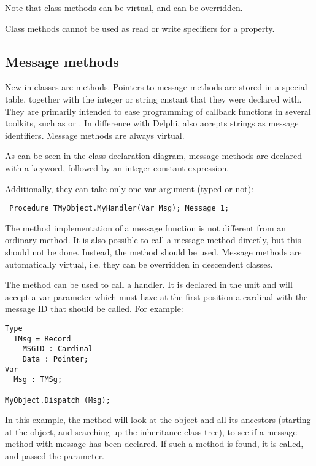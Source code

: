 Note that class methods can be virtual, and can be overridden.

Class methods cannot be used as read or write specifiers for a
property.



\subsection{Message methods}
New in classes are  methods. Pointers to message methods are
stored in a special table, together with the integer or string cnstant that
they were declared with. They are primarily intended to ease programming of
callback functions in several  toolkits, such as  or
. In difference with Delphi, \fpc also accepts strings as message
identifiers. Message methods are always virtual.

As can be seen in the class declaration diagram, message methods are 
declared with a  keyword, followed by an integer constant
expression. 

Additionally, they can take only one var argument (typed or not):
\begin{verbatim}
 Procedure TMyObject.MyHandler(Var Msg); Message 1;
\end{verbatim}
The method implementation of a message function is not different from an
ordinary method. It is also possible to call a message method directly,
but this should not be done. Instead, the  method
should be used. Message methods are automatically virtual,
i.e. they can be overridden in descendent classes.

The  method can be used to call a
handler. It is declared in the  unit and will accept a var
parameter  which must have at the first position a cardinal with the
message ID that should be called. For example:
\begin{verbatim}
Type
  TMsg = Record
    MSGID : Cardinal
    Data : Pointer;
Var
  Msg : TMSg;

MyObject.Dispatch (Msg);
\end{verbatim}
In this example, the  method will look at the object and all
its ancestors (starting at the object, and searching up the inheritance 
class tree), to see if a message method with message  has been
declared. If such a method is found, it is called, and passed the
 parameter.

